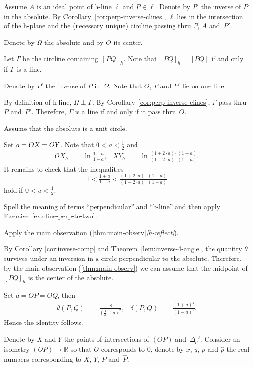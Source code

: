 Assume $A$ is an ideal point of h-line $\ell$
and $P\in \ell$.
Denote by $P'$ the inverse of $P$ in the absolute.
By Corollary~\ref{cor:perp-inverse-clines},
$\ell$ lies in the intersection of the h-plane and the (necessary unique) circline 
passing thru $P$, $A$ and~$P'$.

Denote by $\Omega$ the absolute and by $O$ its center. 

Let $\Gamma$ be the circline containing~$[PQ]_h$.
Note that $[PQ]_h=[PQ]$ if and only if $\Gamma$ is a line.

Denote by $P'$ the inverse of $P$ in~$\Omega$.
Note that $O$, $P$ and $P'$ lie on one line.

By definition of h-line, $\Omega\perp \Gamma$.
By Corollary~\ref{cor:perp-inverse-clines}, $\Gamma$ pass thru $P$ and~$P'$. 
Therefore, $\Gamma$
is a line if and only if it pass thru~$O$.


Assume that the absolute is a unit circle.

Set $a\z=OX\z=OY$.
Note that $0<a<\tfrac12$ and
\begin{align*}
OX_h&=\ln \tfrac{1+a}{1-a},
&
XY_h&=\ln \tfrac{(1+2\cdot a)\cdot(1-a)}{(1-2\cdot a)\cdot(1+a)}.
\end{align*}
It remains to check that the inequalities 
\[1<
\tfrac{1+a}{1-a}
<
\tfrac{(1+2\cdot a)\cdot(1-a)}{(1-2\cdot a)\cdot(1+a)}\]
hold if $0<a<\tfrac12$.

Spell the meaning of terms ``perpendicular'' and ``h-line'' and then apply Exercise~\ref{ex:cline-perp-to-two}.

Apply the main observation (\ref{thm:main-observ}\textit{\ref{h-reflect}}).

By Corollary \ref{cor:invese-comp} and Theorem~\ref{lem:inverse-4-angle},
the quantity $\theta$ survives under an inversion in a circle perpendicular to the absolute.
Therefore, by the main observation (\ref{thm:main-observ})
we can assume that the midpoint of $[PQ]_h$ is the center of the absolute.

Set $a=OP=OQ$, then 
\begin{align*}
\theta(P,Q)&=\frac{8}{(\tfrac1a-a)^2},
&
\delta(P,Q)&=\frac{(1+a)^2}{(1-a)^2}.
\end{align*}
Hence the identity follows.

Denote by $X$ and $Y$ the points of intersections of $(OP)$ and~$\Delta_\rho'$.
Consider an isometry $(OP)\to\mathbb{R}$ so that $O$ corresponds to $0$,
denote by $x$, $y$, $p$ and $\hat p$ the real numbers corresponding to $X$, $Y$, $P$ and~$\hat P$.

